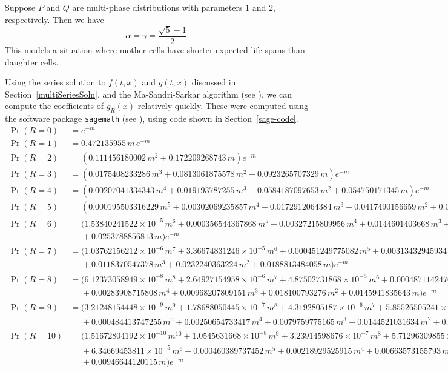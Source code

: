 \documentclass[12pt]{amsart}
\theoremstyle{plain}
\theoremstyle{definition}
\theoremstyle{remark}
\theoremstyle{definition}
\begin{document}
Suppose $P$ and $Q$ are multi-phase distributions with parameters $1$ and $2$, respectively. Then we have
\begin{equation}
\alpha = \gamma = \frac{\sqrt{5}-1}{2}.
\end{equation}
This models a situation where mother cells have shorter expected life-spans than daughter cells.

Using the series solution to $f(t,x)$ and $g(t,x)$ discussed in Section~\ref{multiSeriesSoln}, and the Ma-Sandri-Sarkar algorithm (see \cite{mss}), we can compute the coefficients of $g_R(x)$ relatively quickly.  These were computed using the software package {\tt sagemath} (see \cite{sagemath}), using code shown in Section~\ref{sage-code}.
\Tiny
\def\nl{\\&\phantom{{}={}}}
\begin{align*}
\Pr(R = 0 ) &= e^{-m} \\
\Pr(R = 1 ) &= 0.472135955 \, m \, e^{-m} \\
\Pr(R = 2 ) &= (0.111456180002 \, m^{2} + 0.172209268743 \, m) e^{-m} \\
\Pr(R = 3 ) &= (0.0175408233286 \, m^{3} + 0.0813061875578 \, m^{2} + 0.0923265707329 \, m) e^{-m} \\
\Pr(R = 4 ) &= (0.00207041334343 \, m^{4} + 0.019193787255 \, m^{3} + 0.0584187097653 \, m^{2} + 0.054750171345 \, m) e^{-m}\\
\Pr(R = 5 ) &= (0.000195503316229 \, m^{5} + 0.00302069235857 \, m^{4} + 0.0172912064384 \, m^{3} + 0.0417490156659 \, m^{2} + 0.0359263840576 \, m) e^{-m} \\
\Pr(R = 6 ) &= (1.53840241522 \times 10^{-5} \, m^{6} + 0.000356544367868 \, m^{5} + 0.00327215809956 \, m^{4} + 0.0144601403668 \, m^{3} + 0.0306527224493 \, m^{2} \nl + 0.0253788856813 \, m) e^{-m} \\
\Pr(R = 7 ) &= (1.03762156212 \times 10^{-6} \, m^{7} + 3.36674831246 \times 10^{-5} \, m^{6} + 0.000451249775082 \, m^{5} + 0.00313432945934 \, m^{4} \nl + 0.0118370547378 \, m^{3} + 0.0232240363224 \, m^{2} + 0.0188813484058 \, m) e^{-m} \\
\Pr(R = 8 ) &= (6.12373058949 \times 10^{-8} \, m^{8} + 2.64927154958 \times 10^{-6} \, m^{7} + 4.87502731868 \times 10^{-5} \, m^{6} + 0.000487114247624 \, m^{5} \nl + 0.00283908715808 \, m^{4} + 0.00968207809151 \, m^{3} + 0.018100793276 \, m^{2} + 0.0145941835643 \, m) e^{-m} \\
\Pr(R = 9 ) &= (3.21248154448 \times 10^{-9} \, m^{9} + 1.78688050445 \times 10^{-7} \, m^{8} + 4.3192805187 \times 10^{-6} \, m^{7} + 5.85526505241 \times 10^{-5} \, m^{6} \nl + 0.000484413747255 \, m^{5} + 0.00250654733417 \, m^{4} + 0.0079759775165 \, m^{3} + 0.0144521031634 \, m^{2} + 0.0116173054839 \, m) e^{-m} \\
\Pr(R = 10 ) &= (1.51672804192 \times 10^{-10} \, m^{10} + 1.0545631668 \times 10^{-8} \, m^{9} + 3.23914598676 \times 10^{-7} \, m^{8} + 5.71296309855 \times 10^{-6} \, m^{7} \nl + 6.34669453811 \times 10^{-5} \, m^{6} + 0.000460389737452 \, m^{5} + 0.00218929525915 \, m^{4} + 0.00663573155793 \, m^{3} + 0.0117763023231 \, m^{2} \nl + 0.00946644120115 \, m) e^{-m}
\end{align*}
\end{document}
